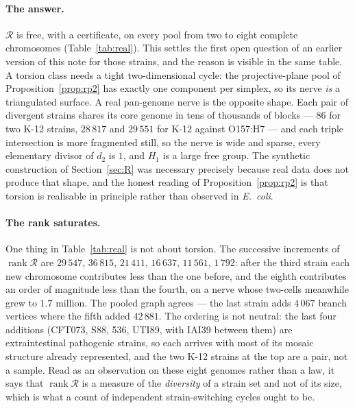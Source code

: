 \documentclass[11pt]{article}
\theoremstyle{plain}
\theoremstyle{definition}
\theoremstyle{remark}
\newcommand{\rank}{\operatorname{rank}}
\newcommand{\Rec}{\mathcal{R}}
\begin{document}
\paragraph{The answer.} $\Rec$ is free, with a certificate, on every pool from two to eight
complete chromosomes (Table~\ref{tab:real}). This settles the first open question of an
earlier version of this note for those strains, and the reason is visible in the same table. A
torsion class needs a tight two-dimensional cycle: the projective-plane pool of
Proposition~\ref{prop:rp2} has exactly one component per simplex, so its nerve \emph{is} a
triangulated surface. A real pan-genome nerve is the opposite shape. Each pair of divergent
strains shares its core genome in tens of thousands of blocks --- $86$ for two K-12 strains,
$28\,817$ and $29\,551$ for K-12 against O157:H7 --- and each triple intersection is more
fragmented still, so the nerve is wide and sparse, every elementary divisor of $d_2$ is $1$,
and $H_1$ is a large free group. The synthetic construction of
Section~\ref{sec:R} was necessary precisely because real data does not produce that shape,
and the honest reading of Proposition~\ref{prop:rp2} is that torsion is realisable in
principle rather than observed in \emph{E.\ coli}.

\paragraph{The rank saturates.} One thing in Table~\ref{tab:real} is not about torsion. The
successive increments of $\rank\Rec$ are $29\,547$, $36\,815$, $21\,411$, $16\,637$,
$11\,561$, $1\,792$: after the third strain each new chromosome contributes less than the
one before, and the eighth contributes an order of magnitude less than the fourth, on a
nerve whose two-cells meanwhile grew to $1.7$ million. The pooled graph agrees --- the last
strain adds $4\,067$ branch vertices where the fifth added $42\,881$. The ordering is not
neutral: the last four additions (CFT073, S88, 536, UTI89, with IAI39 between them) are
extraintestinal pathogenic strains, so each arrives with most of its mosaic structure
already represented, and the two K-12 strains at the top are a pair, not a sample. Read as
an observation on these eight genomes rather than a law, it says that $\rank\Rec$ is a
measure of the \emph{diversity} of a strain set and not of its size, which is what a count
of independent strain-switching cycles ought to be.
\end{document}
